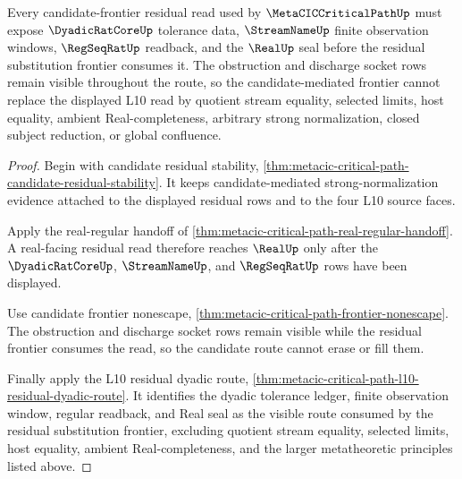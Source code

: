 \begin{theorem}
\label{thm:metacic-critical-path-candidate-residual-l10-frontier-route}
Every candidate-frontier residual read used by $\MetaCICCriticalPathUp$ must expose $\DyadicRatCoreUp$ tolerance data, $\StreamNameUp$ finite observation windows, $\RegSeqRatUp$ readback, and the $\RealUp$ seal before the residual substitution frontier consumes it. The obstruction and discharge socket rows remain visible throughout the route, so the candidate-mediated frontier cannot replace the displayed L10 read by quotient stream equality, selected limits, host equality, ambient Real-completeness, arbitrary strong normalization, closed subject reduction, or global confluence.
\end{theorem}
\begin{proof}
Begin with candidate residual stability, \autoref{thm:metacic-critical-path-candidate-residual-stability}. It keeps candidate-mediated strong-normalization evidence attached to the displayed residual rows and to the four L10 source faces.

Apply the real-regular handoff of \autoref{thm:metacic-critical-path-real-regular-handoff}. A real-facing residual read therefore reaches $\RealUp$ only after the $\DyadicRatCoreUp$, $\StreamNameUp$, and $\RegSeqRatUp$ rows have been displayed.

Use candidate frontier nonescape, \autoref{thm:metacic-critical-path-frontier-nonescape}. The obstruction and discharge socket rows remain visible while the residual frontier consumes the read, so the candidate route cannot erase or fill them.

Finally apply the L10 residual dyadic route, \autoref{thm:metacic-critical-path-l10-residual-dyadic-route}. It identifies the dyadic tolerance ledger, finite observation window, regular readback, and Real seal as the visible route consumed by the residual substitution frontier, excluding quotient stream equality, selected limits, host equality, ambient Real-completeness, and the larger metatheoretic principles listed above.
\end{proof}

